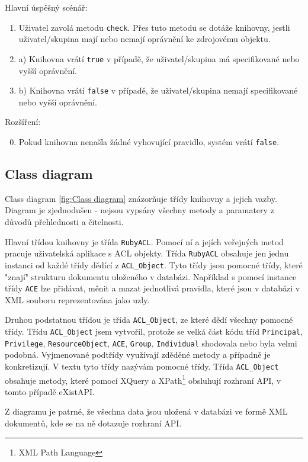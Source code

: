 Hlavní úspěšný scénář:
\begin{enumerate}
\item Uživatel zavolá metodu \verb|check|. Přes tuto metodu se dotáže knihovny, jestli uživatel/skupina mají nebo nemají oprávnění ke zdrojovému objektu.
\item a) Knihovna vrátí \verb|true| v případě, že uživatel/skupina má specifikované nebo vyšší oprávnění.
\setcounter{enumi}{1}
\item b) Knihovna vrátí \verb|false| v případě, že uživatel/skupina nemají specifikované nebo vyšší oprávnění.
\end{enumerate}
Rozšíření:
\begin{enumerate}
\setcounter{enumi}{-1}
\item Pokud knihovna nenašla žádné vyhovující pravidlo, systém vrátí \verb|false|.
\end{enumerate}


\subsection{Class diagram}
Class diagram \ref{fig:Class diagram} znázorňuje třídy knihovny a jejich vazby. Diagram je zjednodušen - nejsou vypsány všechny metody a paramatery z důvodů přehlednosti a čitelnosti. 

Hlavní třídou knihovny je třída \verb|RubyACL|. Pomocí ní a jejích veřejných metod pracuje uživatelská aplikace s ACL objekty. Třída \verb|RubyACL| obsahuje jen jednu instanci od každé třídy dědící z \verb|ACL_Object|. Tyto třídy jsou pomocné třídy, které "znají" strukturu dokumentu uloženého v databázi. Například s pomocí instance třídy \verb|ACE| lze přidávat, měnit a mazat jednotlivá pravidla, které jsou v databázi v XML souboru reprezentována jako uzly.

Druhou podstatnou třídou je třída \verb|ACL_Object|, ze které dědí všechny pomocné třídy. Třídu \verb|ACL_Object| jsem vytvořil, protože se velká část kódu tříd \verb|Principal|, \verb|Privilege|, \verb|ResourceObject|, \verb|ACE|, \verb|Group|, \verb|Individual| shodovala nebo byla velmi podobná. Vyjmenované podtřídy využívají zděděné metody a případně je konkretizují. V textu tyto třídy nazývám pomocné třídy.
Třída  \verb|ACL_Object| obsahuje metody, které pomocí XQuery a XPath\footnote{XML Path Language} obsluhují rozhraní API, v tomto případě eXistAPI.

Z diagramu je patrné, že všechna data jsou uložená v databázi ve formě XML dokumentů, kde se na ně dotazuje rozhraní API.


